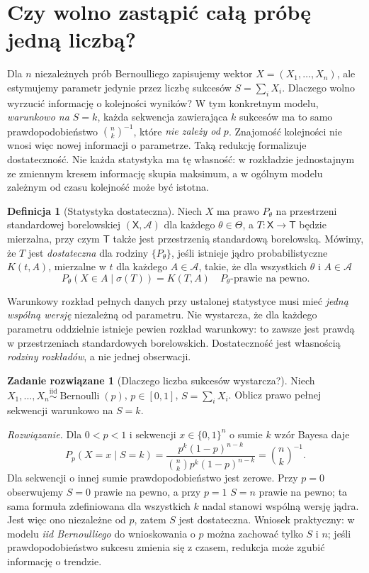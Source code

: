 \documentclass[11pt,a4paper,oneside]{report}
\numberwithin{equation}{chapter}
\theoremstyle{plain}
\theoremstyle{definition}
\newtheorem{definicja}{Definicja}[chapter]
\newtheorem{zadanie}{Zadanie rozwiązane}[chapter]
\theoremstyle{remark}
\newcommand{\calA}{\mathcal A}
\newcommand{\iid}{\mathrel{\overset{\mathrm{iid}}\sim}}
\begin{document}
\section{Czy wolno zastąpić całą próbę jedną liczbą?}
Dla $n$ niezależnych prób Bernoulliego zapisujemy wektor
$X=(X_1,\ldots,X_n)$, ale estymujemy parametr jedynie przez
liczbę sukcesów $S=\sum_i X_i$. Dlaczego wolno wyrzucić
informację o kolejności wyników? W tym konkretnym modelu,
\emph{warunkowo na $S=k$}, każda sekwencja zawierająca $k$
sukcesów ma to samo prawdopodobieństwo $\binom nk^{-1}$,
które \emph{nie zależy od $p$}. Znajomość kolejności nie wnosi
więc nowej informacji o parametrze. Taką redukcję formalizuje
dostateczność. Nie każda statystyka ma tę własność: w rozkładzie
jednostajnym ze zmiennym kresem informację skupia maksimum,
a w ogólnym modelu zależnym od czasu kolejność może być istotna.

\begin{definicja}[Statystyka dostateczna]\label{def:sufficiency}
Niech $X$ ma prawo $P_\theta$ na przestrzeni standardowej borelowskiej
$(\mathsf X,\calA)$ dla każdego $\theta\in\Theta$,
a $T:\mathsf X\to\mathsf T$ będzie mierzalna, przy czym
$\mathsf T$ także jest przestrzenią standardową borelowską.
Mówimy, że $T$ jest \emph{dostateczna} dla rodziny
$\{P_\theta\}$, jeśli istnieje jądro probabilistyczne
$K(t,A)$, mierzalne w $t$ dla każdego $A\in\calA$,
takie, że dla wszystkich $\theta$ i $A\in\calA$
\[
P_\theta(X\in A\mid\sigma(T))=K(T,A)
\quad P_\theta\text{-prawie na pewno}.
\]
\end{definicja}

Warunkowy rozkład pełnych danych przy ustalonej statystyce musi mieć
\emph{jedną wspólną wersję} niezależną od parametru. Nie wystarcza,
że dla każdego parametru oddzielnie istnieje pewien rozkład
warunkowy: to zawsze jest prawdą w przestrzeniach standardowych
borelowskich. Dostateczność jest własnością \emph{rodziny rozkładów},
a nie jednej obserwacji.

\begin{zadanie}[Dlaczego liczba sukcesów wystarcza?]\label{zad:suff-bernoulli}
Niech $X_1,\ldots,X_n\iid\operatorname{Bernoulli}(p)$,
$p\in[0,1]$, $S=\sum_iX_i$. Oblicz prawo pełnej sekwencji
warunkowo na $S=k$.
\par\emph{Rozwiązanie.} Dla $0<p<1$ i sekwencji
$x\in\{0,1\}^n$ o sumie $k$ wzór Bayesa daje
\[
P_p(X=x\mid S=k)=\frac{p^k(1-p)^{n-k}}
 {\binom nk p^k(1-p)^{n-k}}=\binom nk^{-1}.
\]
Dla sekwencji o innej sumie prawdopodobieństwo jest zerowe.
Przy $p=0$ obserwujemy $S=0$ prawie na pewno, a przy $p=1$
$S=n$ prawie na pewno; ta sama formuła zdefiniowana dla wszystkich
$k$ nadal stanowi wspólną wersję jądra. Jest więc ono niezależne
od $p$, zatem $S$ jest dostateczna. Wniosek praktyczny:
w modelu \emph{iid Bernoulliego} do wnioskowania o $p$ można
zachować tylko $S$ i $n$; jeśli prawdopodobieństwo sukcesu zmienia
się z czasem, redukcja może zgubić informację o trendzie.
\end{zadanie}
\end{document}
